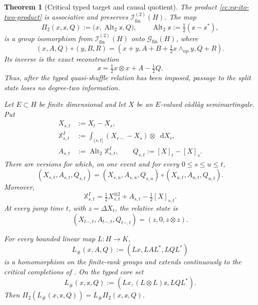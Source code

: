 \documentclass[10pt,reqno]{amsart}
\theoremstyle{plain}
\newtheorem{theorem}{Theorem}[section]
\theoremstyle{definition}
\theoremstyle{remark}
\begin{document}
\begin{theorem}[Critical typed target and causal quotient]
\label{cc:thm-critical-typed-target}
The product \eqref{cc:eq-ito-two-product} is associative and preserves
\(\mathscr I^{(2)}_{\mathrm{fin}}(H)\).  The map
\begin{equation}
 \Pi_2(x,\mathbb x,Q)
 :=\bigl(x,\operatorname{Alt}_2\mathbb x,Q\bigr),
 \qquad
 \operatorname{Alt}_2\mathbb x:=\tfrac12(\mathbb x-\mathbb x^*),
 \label{cc:eq-split-quotient}
\end{equation}
is a group isomorphism from \(\mathscr I^{(2)}_{\mathrm{fin}}(H)\) onto
\(\mathscr G_{\mathrm{fin}}(H)\), where
\[
 (x,A,Q)\circ(y,B,R)
 =\left(x+y,A+B+\tfrac12x\wedge_{\mathrm{op}}y,Q+R\right).
\]
Its inverse is the exact reconstruction
\begin{equation}
 \mathbb x=\tfrac12x\otimes x+A-\tfrac12Q.
 \label{cc:eq-split-reconstruction}
\end{equation}
Thus, after the typed quasi-shuffle relation has been imposed, passage to
the split state loses no degree-two information.

Let \(E\subset H\) be finite dimensional and let \(X\) be an
\(E\)-valued c\`adl\`ag semimartingale.  Put
\begin{align*}
 X_{s,t}&:=X_t-X_s,\\
 \mathbb X^I_{s,t}
 &:=\int_{(s,t]}(X_{r-}-X_s)\otimes\mathop{}\!\mathrm dX_r,\\
 A_{s,t}&:=\operatorname{Alt}_2\mathbb X^I_{s,t},
 \qquad
 Q_{s,t}:=[X]_t-[X]_s.
\end{align*}
There are versions for which, on one event and for every
\(0\leq s\leq u\leq t\),
\begin{equation}
 (X_{s,t},A_{s,t},Q_{s,t})
 =(X_{s,u},A_{s,u},Q_{s,u})
  \circ(X_{u,t},A_{u,t},Q_{u,t}).
 \label{cc:eq-critical-split-Chen}
\end{equation}
Moreover,
\begin{equation}
 \mathbb X^I_{s,t}
 =\tfrac12X_{s,t}^{\otimes 2}+A_{s,t}-\tfrac12[X]_{s,t}.
 \label{cc:eq-critical-Ito-reconstruction}
\end{equation}
At every jump time \(t\), with \(z=\Delta X_t\), the relative state is
\begin{equation}
 (X_{t-,t},A_{t-,t},Q_{t-,t})=(z,0,z\otimes z).
 \label{cc:eq-critical-single-jump}
\end{equation}

For every bounded linear map \(L:H\to K\),
\[
 L_\#(x,A,Q):=(Lx,LAL^*,LQL^*)
\]
is a homomorphism on the finite-rank groups and extends continuously to the
critical completions of .  On the
typed core set
\[
 L_\#(x,\mathbb x,Q):=(Lx,(L\otimes L)\mathbb x,LQL^*).
\]
Then
\(\Pi_2(L_\#(x,\mathbb x,Q))=L_\#\Pi_2(x,\mathbb x,Q)\).
\end{theorem}
\end{document}
